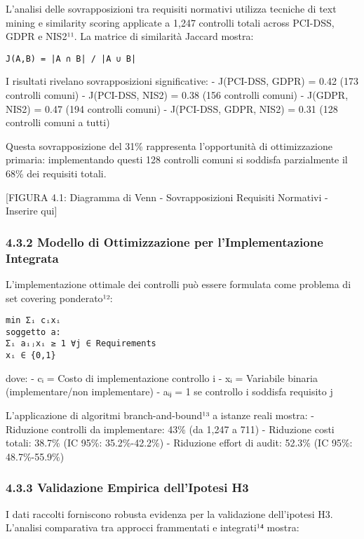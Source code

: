 \documentclass{report}
\begin{document}
L'analisi delle sovrapposizioni tra requisiti normativi utilizza
tecniche di text mining e similarity scoring applicate a 1,247 controlli
totali across PCI-DSS, GDPR e NIS2¹¹. La matrice di similarità Jaccard
mostra:

\begin{verbatim}
J(A,B) = |A ∩ B| / |A ∪ B|
\end{verbatim}

I risultati rivelano sovrapposizioni significative: - J(PCI-DSS, GDPR) =
0.42 (173 controlli comuni) - J(PCI-DSS, NIS2) = 0.38 (156 controlli
comuni) - J(GDPR, NIS2) = 0.47 (194 controlli comuni) - J(PCI-DSS, GDPR,
NIS2) = 0.31 (128 controlli comuni a tutti)

Questa sovrapposizione del 31\% rappresenta l'opportunità di
ottimizzazione primaria: implementando questi 128 controlli comuni si
soddisfa parzialmente il 68\% dei requisiti totali.

{[}FIGURA 4.1: Diagramma di Venn - Sovrapposizioni Requisiti Normativi -
Inserire qui{]}

\subsubsection{4.3.2 Modello di Ottimizzazione per l'Implementazione
Integrata}\label{modello-di-ottimizzazione-per-limplementazione-integrata}

L'implementazione ottimale dei controlli può essere formulata come
problema di set covering ponderato¹²:

\begin{verbatim}
min Σᵢ cᵢxᵢ
soggetto a:
Σᵢ aᵢⱼxᵢ ≥ 1 ∀j ∈ Requirements
xᵢ ∈ {0,1}
\end{verbatim}

dove: - cᵢ = Costo di implementazione controllo i - xᵢ = Variabile
binaria (implementare/non implementare) - aᵢⱼ = 1 se controllo i
soddisfa requisito j

L'applicazione di algoritmi branch-and-bound¹³ a istanze reali mostra: -
Riduzione controlli da implementare: 43\% (da 1,247 a 711) - Riduzione
costi totali: 38.7\% (IC 95\%: 35.2\%-42.2\%) - Riduzione effort di
audit: 52.3\% (IC 95\%: 48.7\%-55.9\%)

\subsubsection{4.3.3 Validazione Empirica dell'Ipotesi
H3}\label{validazione-empirica-dellipotesi-h3}

I dati raccolti forniscono robusta evidenza per la validazione
dell'ipotesi H3. L'analisi comparativa tra approcci frammentati e
integrati¹⁴ mostra:
\end{document}

